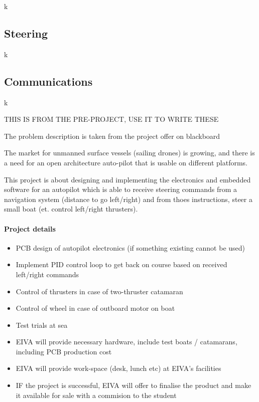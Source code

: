 k

\subsection{Steering}
k

\subsection{Communications}
k

THIS IS FROM THE PRE-PROJECT, USE IT TO WRITE THESE

The problem description is taken from the project offer on blackboard\cite{EIVA-description}

The market for unmanned surface vessels (sailing drones) is growing, and there is a need for an open architecture auto-pilot that is usable on different platforms.

This project is about designing and implementing the electronics and embedded software for an autopilot which is able to receive steering commands from a navigation system (distance to go left/right) and from thoes instructions, steer a small boat (et. control left/right thrusters).


\paragraph{Project details}
\begin{itemize}
\item PCB design of autopilot electronics (if something existing cannot be used)
\item Implement PID control loop to get back on course based on received left/right commands
\item Control of thrusters in case of two-thruster catamaran
\item Control of wheel in case of outboard motor on boat
\item Test trials at sea
\item EIVA will provide necessary hardware, include test boats / catamarans, including PCB production cost
\item EIVA will provide work-space (desk, lunch etc) at EIVA's facilities
\item IF the project is successful, EIVA will offer to finalise the product and make it available for sale with a commision to the student
\end{itemize}